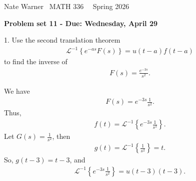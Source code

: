 \documentclass{report}
\title{\Huge{}}
\author{\huge{Nathan Warner}}
\date{\huge{}}
\begin{document}
    \pagebreak \bigbreak \noindent
    Nate Warner \ \quad \quad \quad \quad \quad \quad \quad \quad \quad \quad \quad \quad  MATH 336 \quad  \quad \quad \quad \quad \quad \quad \quad \quad \ \ \quad \quad Spring 2026
    \begin{center}
        \textbf{Problem set 11 - Due: Wednesday, April 29 }
    \end{center}
    \bigbreak \noindent 
    \begin{mdframed}
        1. Use the second translation theorem
        \begin{align*}
            \mathcal{L}^{-1}\left\{e^{-as}F(s)\right\} = u(t-a)f(t-a)
        \end{align*}
        to find the inverse of 
        \begin{align*}
            F(s) = \frac{e^{-3s}}{s^{2}}
        .\end{align*}
    \end{mdframed}
    \bigbreak \noindent 
    We have
    \begin{align*}
        F(s) = e^{-3s}\frac{1}{s^{2}}
    .\end{align*}
    Thus,
    \begin{align*}
        f(t) = \mathcal{L}^{-1}\left\{e^{-3s}\frac{1}{s^{2}}\right\}
    .\end{align*}
    Let $G(s) = \frac{1}{s^{2}}$, then 
    \begin{align*}
        g(t) = \mathcal{L}^{-1}\left\{\frac{1}{s^{2}}\right\} = t
    .\end{align*}
    So, $g(t-3)  = t-3$, and 
    \begin{align*}
        \mathcal{L}^{-1}\left\{e^{-3s}\frac{1}{s^{2}}\right\} = u(t-3)(t-3)
    .\end{align*}
\end{document}
